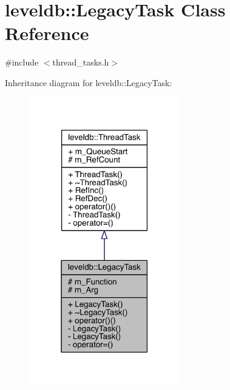 \hypertarget{classleveldb_1_1_legacy_task}{}\section{leveldb\+:\+:Legacy\+Task Class Reference}
\label{classleveldb_1_1_legacy_task}


{\ttfamily \#include $<$thread\+\_\+tasks.\+h$>$}



Inheritance diagram for leveldb\+:\+:Legacy\+Task\+:\nopagebreak
\begin{figure}[H]
\begin{center}
\leavevmode
\includegraphics[width=186pt]{classleveldb_1_1_legacy_task__inherit__graph}
\end{center}
\end{figure}


